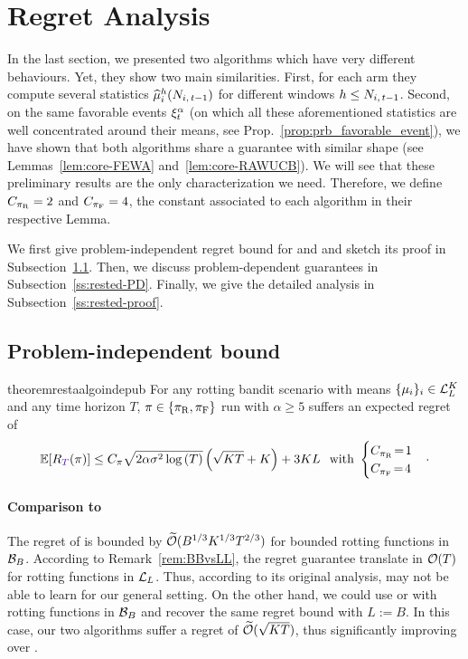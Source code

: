 \section{Regret Analysis}\label{sec:theory}

In the last section, we presented two algorithms which have very different behaviours. Yet, they show two main similarities. First, for each arm they compute several statistics $\widehat{\mu}_i^h(N_{i,\,t-1})$ for different windows $h\leq N_{i,\,t-1}$. Second, on the same favorable events $\xi^\alpha_t$ (on which all these aforementioned statistics are well concentrated around their means, see Prop.~\ref{prop:prb_favorable_event}), we have shown that both algorithms share a guarantee with similar shape (see Lemmas~\ref{lem:core-FEWA} and~\ref{lem:core-RAWUCB}). We will see that these preliminary results are the only characterization we need. Therefore, we define $C_{\pi_{\rm R}} = 2$ and $C_{\pi_{\rm F}} = 4$, the constant associated to each algorithm in their respective Lemma. 

We first give problem-independent regret bound for \FEWA and \RUCB and sketch its proof in Subsection~\ref{ss:rested-PI}. Then, we discuss problem-dependent guarantees in Subsection~\ref{ss:rested-PD}. Finally, we give the detailed analysis in Subsection~\ref{ss:rested-proof}.


\subsection{Problem-independent bound}
\label{ss:rested-PI}
\begin{restatable}{theorem}{restaalgoindepub}
\label{th:rested-PI}
For any rotting bandit scenario with means $\{\mu_i\}_{i} \in \mathcal{L}_L^K$ and any time horizon $T$, $\pi \in \left\{\pi_{\rm R}, \pi_{\rm F} \right\}$ run with $\alpha \geq 5$ suffers an expected regret of
\begin{equation*}
\mathbb{E}[\regret(\pi)] \leq C_\pi\sqrt{2\alpha\sigma^2\log\pa{T}}\pa{\sqrt{KT} +K} + 3KL\, \;\; \text{with } 
\begin{cases}
C_{\piR} \!=\! 1\\
C_{\piF} \!=\! 4
\end{cases}\!\cdot
\end{equation*}
\end{restatable}
\paragraph{Comparison to \citet{levine2017rotting}} The regret of \SWA is bounded by $\widetilde{\mathcal{O}}(B^{1/3}K^{1/3} T^{2/3})$ for bounded rotting functions in $\mathcal{B}_{B}$. According to Remark~\ref{rem:BBvsLL}, the regret guarantee translate in $\mathcal{O}(T)$ for rotting functions in $\mathcal{L}_L$.  Thus, according to its original analysis, \SWA may not be able to learn for our general setting. On the other hand, we could use \FEWA or \RUCB with rotting functions in $\mathcal{B}_{B}$ and recover the same regret bound with $L := B$. In this case, our two algorithms suffer a regret of $\widetilde{\mathcal{O}}(\sqrt{KT})$, thus significantly improving over \SWA. 

